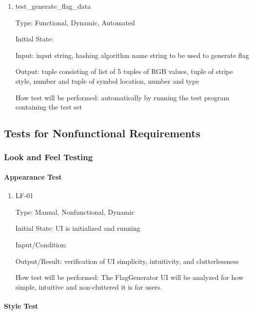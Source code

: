 \documentclass[12pt, titlepage]{article}
\begin{document}
\begin{enumerate}
\item{test\_generate\_flag\_data\\}

Type: Functional, Dynamic, Automated

Initial State:

Input: input string, hashing algorithm name string to be used to generate flag

Output: tuple consisting of list of 5 tuples of RGB values, tuple of stripe
style, number and tuple of symbol location, number and type

How test will be performed: automatically by running the test program
containing the test set

\end{enumerate}

\subsection{Tests for Nonfunctional Requirements}

\subsubsection{Look and Feel Testing}
		
\paragraph{Appearance Test}

\begin{enumerate}

\item{LF-01\\}

Type: Manual, Nonfunctional, Dynamic

Initial State: UI is initialized and running

Input/Condition: 

Output/Result: verification of UI simplicity, intuitivity, and clutterlessness

How test will be performed: The FlagGenerator UI will be analyzed for how
simple, intuitive and non-cluttered it is for users.

\end{enumerate}

\paragraph{Style Test}
\end{document}
